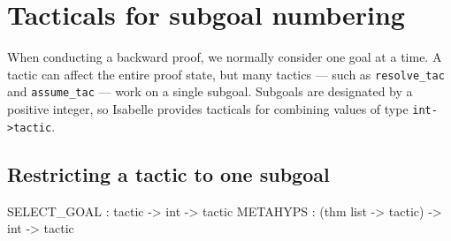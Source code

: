 

\section{Tacticals for subgoal numbering}
When conducting a backward proof, we normally consider one goal at a time.
A tactic can affect the entire proof state, but many tactics --- such as
{\tt resolve_tac} and {\tt assume_tac} --- work on a single subgoal.
Subgoals are designated by a positive integer, so Isabelle provides
tacticals for combining values of type {\tt int->tactic}.


\subsection{Restricting a tactic to one subgoal}
\begin{ttbox} 
SELECT_GOAL : tactic -> int -> tactic
METAHYPS    : (thm list -> tactic) -> int -> tactic
\end{ttbox}
